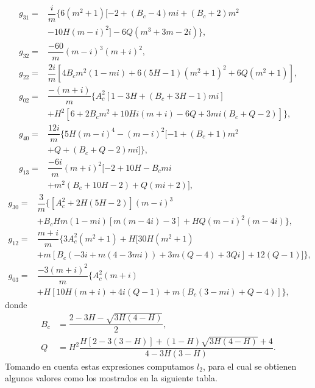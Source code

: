 \begin{equation}
	\begin{aligned}
		g_{31} = & \dfrac{i}{m} \{6(m^2+1)[-2 + (B_c-4)mi + (B_c+2)m^2 \\
		& - 10H(m-i)^2] - 6Q(m^3 + 3m -2i)\}, \\
		g_{32} = & \dfrac{-60}{m}(m-i)^3 (m+i)^2, \\
		g_{22} = & \dfrac{2i}{m} [4B_cm^2(1 - mi) + 6(5H-1)(m^2+1)^2 + 6Q(m^2+1)], \\
		g_{02} = & \dfrac{-(m+i)}{m}\{ A_c^2[1 - 3H + (B_c + 3H - 1)mi] \\
		& + H^2[6 + 2B_cm^2 + 10Hi(m+i) - 6Q + 3mi(B_c + Q - 2)] \}, \\
		g_{40} = & \dfrac{12i}{m} \{ 5H(m-i)^4 - (m-i)^2[-1 + (B_c+1)m^2 \\
		& + Q + (B_c + Q - 2)mi] \}, \\
		g_{13} = & \dfrac{-6i}{m} (m+i)^2[-2 + 10H - B_cmi \\
		& + m^2(B_c + 10H-2) + Q(mi+2)],
	\end{aligned}
\end{equation}
\begin{equation*}
	\begin{aligned}
		g_{30} = & \dfrac{3}{m} \{ [A_c^2 + 2H(5H-2)](m-i)^3 \\
		& + B_cHm(1 - mi)[m(m-4i)-3] + HQ(m-i)^2(m-4i) \}, \\
		g_{12} = & \dfrac{m+i}{m} \{3A_c^2(m^2+1) + H[30H(m^2+1)\\
		& + m[B_c(-3i + m(4 - 3mi)) + 3m(Q-4) + 3Qi] + 12(Q-1)]\}, \\
		g_{03} = & \dfrac{-3(m+i)^2}{m} \{A_c^2(m+i) \\
		& + H\left[10H(m+i) + 4i(Q-1) + m(B_c(3 - mi) + Q -4)\right]\},
	\end{aligned}
\end{equation*}
donde
\begin{equation*}
	\begin{aligned}
		B_c &= \dfrac{2-3H - \sqrt{3H(4 - H)}}{2}, \\
		Q &= H^2 \dfrac{H[2-3(3-H)]+(1-H)\sqrt{3H(4-H)}+4}{4-3H(3-H)}.
	\end{aligned}
\end{equation*}
Tomando en cuenta estas expresiones computamos $l_2$, para el cual se obtienen algunos valores como los mostrados en la siguiente tabla.
